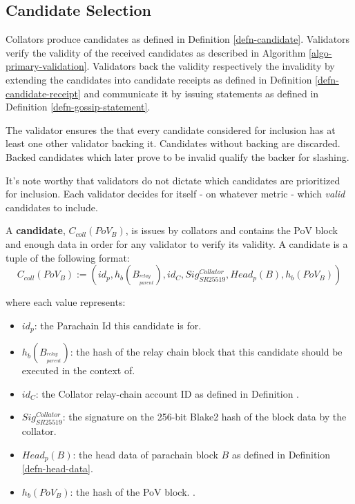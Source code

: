 \subsection{Candidate Selection}
\label{sect-primary-validation}

Collators produce candidates as defined in Definition \ref{defn-candidate}.
Validators verify the validity of the received candidates as described in
Algorithm \ref{algo-primary-validation}.  Validators
back the validity respectively the invalidity by extending the candidates into 
candidate receipts as defined in Definition \ref{defn-candidate-receipt} and
communicate it by issuing statements as defined in Definition
\ref{defn-gossip-statement}.
\newline

The validator ensures the that every candidate considered for inclusion has at least
one other validator backing it. Candidates without backing are discarded. Backed candidates 
which later prove to be invalid qualify the backer for slashing.
\newline

It's note worthy that validators do not dictate which candidates are prioritized
for inclusion. Each validator decides for itself - on whatever metric - which
\textit{valid} candidates to include.

\begin{definition}
  \label{defn-candidate}
  A \textbf{candidate}, $C_{coll}(PoV_B)$, is issues by collators and contains the PoV
  block and enough data in order for any validator to verify its validity. A
  candidate is a tuple of the following format:
  \[
  C_{coll}(PoV_B) := (id_p, h_b({B_{^{relay}_{parent}}}), id_{C}, Sig^{Collator}_{SR25519}, Head_p(B), h_b({PoV_B}))
  \]

  where each value represents:
  \begin{itemize}
    \item $id_p$: the Parachain Id this candidate is for.
    \item $h_b({B_{^{relay}_{parent}}})$: the hash of the relay chain block that this
    candidate should be executed in the context of.
    \item $id_C$: the Collator relay-chain account ID as defined in Definition
    .
    \item $Sig^{Collator}_{SR25519}$: the signature on the 256-bit Blake2 hash
    of the block data by the collator.
    \item $Head_p(B)$: the head data of parachain block $B$ as defined in
    Definition \ref{defn-head-data}.
    \item $h_b({PoV_B})$: the hash of the PoV block.
    .
  \end{itemize}

\end{definition}

